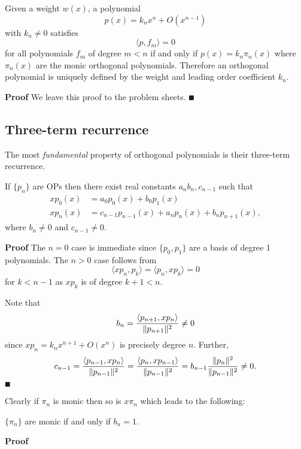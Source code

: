 \begin{theorem} Given a weight $w(x)$, a polynomial
\[
p(x) = k_n x^n + O(x^{n-1})
\]
with $k_n \ensuremath{\neq} 0$ satisfies
\[
\ensuremath{\langle}p,f_m\ensuremath{\rangle} = 0
\]
for all  polynomials $f_m$ of degree $m < n$ if and only if $p(x) = k_n \ensuremath{\pi}_n(x)$ where $\ensuremath{\pi}_n(x)$ are the monic orthogonal polynomials. Therefore an orthogonal polynomial is uniquely defined by the weight and leading order coefficient $k_n$.

\end{theorem}
\textbf{Proof} We leave this proof to the problem sheets. \ensuremath{\QED}

\subsection{Three-term recurrence}
The most \emph{fundamental} property of orthogonal polynomials is their three-term recurrence.

\begin{theorem} If $\{p_n\}$ are OPs then there exist real constants $a_n b_n, c_{n-1}$ such that
\begin{align*}
x p_0(x) &= a_0 p_0(x) + b_0 p_1(x)  \\
x p_n(x) &= c_{n-1} p_{n-1}(x) + a_n p_n(x) + b_n p_{n+1}(x),
\end{align*}
where $b_n \ensuremath{\neq}0$ and $c_{n-1} \ensuremath{\neq}0$. \end{theorem}
\textbf{Proof} The $n=0$ case is immediate since $\{p_0,p_1\}$ are a basis of degree 1 polynomials. The $n >0$ case follows from
\[
\ensuremath{\langle}x p_n, p_k\ensuremath{\rangle} = \ensuremath{\langle} p_n, xp_k\ensuremath{\rangle} = 0
\]
for $k < n-1$ as $x p_k$ is of degree $k+1 < n$.

Note that
\[
b_n = {\ensuremath{\langle}p_{n+1}, x p_n\ensuremath{\rangle} \over \|p_{n+1} \|^2} \ensuremath{\neq} 0
\]
since $x p_n = k_n x^{n+1} + O(x^n)$ is precisely degree $n$. Further,
\[
c_{n-1} = {\ensuremath{\langle}p_{n-1}, x p_n\ensuremath{\rangle} \over \|p_{n-1}\|^2 } =
{\ensuremath{\langle}p_n, x p_{n-1}\ensuremath{\rangle}  \over \|p_{n-1}\|^2 } =  b_{n-1}{\|p_n\|^2  \over \|p_{n-1}\|^2 } \ensuremath{\neq} 0.
\]
\ensuremath{\QED}

Clearly if $\ensuremath{\pi}_n$ is monic then so is $x \ensuremath{\pi}_n$ which leads to the following:

\begin{corollary} $\{\ensuremath{\pi}_n\}$ are monic if and only if $b_n =  1$. \end{corollary}
\textbf{Proof}

